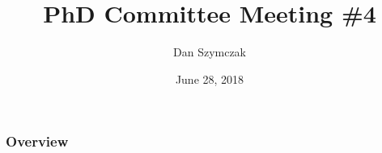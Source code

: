 \documentclass{beamer}
\title[\pgfuseimage{logo}]  %
{PhD Committee Meeting \#4}
\author[Slide \thepage~of \pageref{TotPages}] %
{Dan Szymczak}
\institute[McMaster University] %
{
  Computing and Software Department\\
  Faculty of Engineering\\
  McMaster University
}
\date[June 28, 2018] %
{June 28, 2018}
\begin{document}
\begin{frame}

\titlepage

\end{frame}


\begin{frame}

\frametitle{Overview}
\tableofcontents


\end{frame}

%
%


%
%
%


%
%
%
\end{document}
